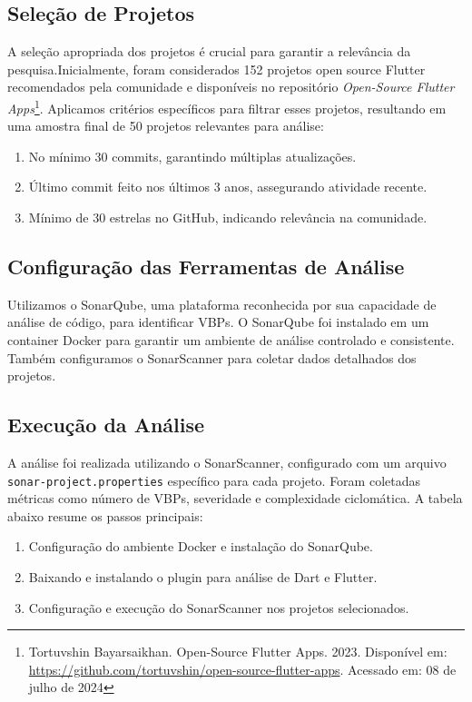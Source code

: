 \documentclass[12pt]{article}
\begin{document}
\subsection{Seleção de Projetos}
A seleção apropriada dos projetos é crucial para garantir a relevância da pesquisa.Inicialmente, foram considerados 152 projetos open source Flutter recomendados pela comunidade e disponíveis no repositório \textit{Open-Source Flutter Apps}\footnote{Tortuvshin Bayarsaikhan. Open-Source Flutter Apps. 2023. Disponível em: \url{https://github.com/tortuvshin/open-source-flutter-apps}. Acessado em: 08 de julho de 2024}. Aplicamos critérios específicos para filtrar esses projetos, resultando em uma amostra final de 50 projetos relevantes para análise:
\begin{enumerate}
    \item No mínimo 30 commits, garantindo múltiplas atualizações.
    \item Último commit feito nos últimos 3 anos, assegurando atividade recente.
    \item Mínimo de 30 estrelas no GitHub, indicando relevância na comunidade.
\end{enumerate}

\subsection{Configuração das Ferramentas de Análise}
Utilizamos o SonarQube, uma plataforma reconhecida por sua capacidade de análise de código, para identificar VBPs. O SonarQube foi instalado em um container Docker para garantir um ambiente de análise controlado e consistente. Também configuramos o SonarScanner para coletar dados detalhados dos projetos.

\subsection{Execução da Análise}
A análise foi realizada utilizando o SonarScanner, configurado com um arquivo \texttt{sonar-project.properties} específico para cada projeto. Foram coletadas métricas como número de VBPs, severidade e complexidade ciclomática. A tabela abaixo resume os passos principais:
\begin{enumerate}
    \item Configuração do ambiente Docker e instalação do SonarQube.
    \item Baixando e instalando o plugin para análise de Dart e Flutter.
    \item Configuração e execução do SonarScanner nos projetos selecionados.
\end{enumerate}
\end{document}

